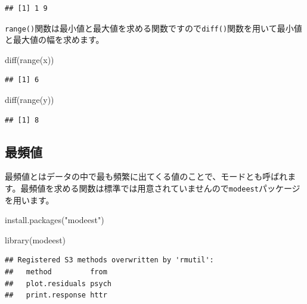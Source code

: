 \documentclass[
  12pt,
]{book}
\newenvironment{Shaded}{\begin{snugshade}}{\end{snugshade}}
\newcommand{\FunctionTok}[1]{\textcolor[rgb]{0.00,0.00,0.00}{#1}}
\newcommand{\NormalTok}[1]{#1}
\newcommand{\StringTok}[1]{\textcolor[rgb]{0.31,0.60,0.02}{#1}}
\begin{document}
\begin{verbatim}
## [1] 1 9
\end{verbatim}

\texttt{range()}関数は最小値と最大値を求める関数ですので\texttt{diff()}関数を用いて最小値と最大値の幅を求めます。

\begin{Shaded}
\begin{Highlighting}[]
\FunctionTok{diff}\NormalTok{(}\FunctionTok{range}\NormalTok{(x))}
\end{Highlighting}
\end{Shaded}

\begin{verbatim}
## [1] 6
\end{verbatim}

\begin{Shaded}
\begin{Highlighting}[]
\FunctionTok{diff}\NormalTok{(}\FunctionTok{range}\NormalTok{(y))}
\end{Highlighting}
\end{Shaded}

\begin{verbatim}
## [1] 8
\end{verbatim}

\hypertarget{ux6700ux983bux5024}{%
\subsection{最頻値}\label{ux6700ux983bux5024}}

最頻値とはデータの中で最も頻繁に出てくる値のことで、モードとも呼ばれます。最頻値を求める関数は標準では用意されていませんので\texttt{modeest}パッケージを用います。

\begin{Shaded}
\begin{Highlighting}[]
\FunctionTok{install.packages}\NormalTok{(}\StringTok{"modeest"}\NormalTok{)}
\end{Highlighting}
\end{Shaded}

\begin{Shaded}
\begin{Highlighting}[]
\FunctionTok{library}\NormalTok{(modeest)}
\end{Highlighting}
\end{Shaded}

\begin{verbatim}
## Registered S3 methods overwritten by 'rmutil':
##   method         from 
##   plot.residuals psych
##   print.response httr
\end{verbatim}
\end{document}
